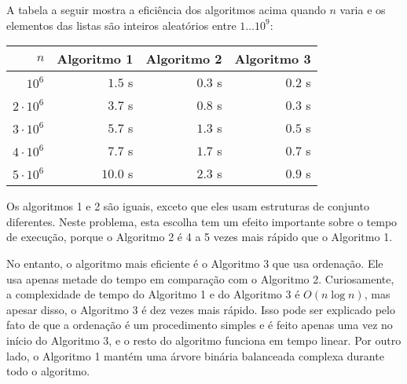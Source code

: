 A tabela a seguir mostra a eficiência
dos algoritmos acima quando $n$ varia e
os elementos das listas são inteiros aleatórios
entre $1 \ldots 10^9$:

\begin{center}
\begin{tabular}{rrrr}
$n$ & Algoritmo 1 & Algoritmo 2 & Algoritmo 3 \\
\hline
$10^6$ & $1.5$ s & $0.3$ s & $0.2$ s \\
$2 \cdot 10^6$ & $3.7$ s & $0.8$ s & $0.3$ s \\
$3 \cdot 10^6$ & $5.7$ s & $1.3$ s & $0.5$ s \\
$4 \cdot 10^6$ & $7.7$ s & $1.7$ s & $0.7$ s \\
$5 \cdot 10^6$ & $10.0$ s & $2.3$ s & $0.9$ s \\
\end{tabular}
\end{center}

Os algoritmos 1 e 2 são iguais, exceto que
eles usam estruturas de conjunto diferentes.
Neste problema, esta escolha tem um efeito importante sobre
o tempo de execução, porque o Algoritmo 2
é 4 a 5 vezes mais rápido que o Algoritmo 1.

No entanto, o algoritmo mais eficiente é o Algoritmo 3
que usa ordenação.
Ele usa apenas metade do tempo em comparação com o Algoritmo 2.
Curiosamente, a complexidade de tempo do Algoritmo 1
e do Algoritmo 3 é $O(n \log n)$,
mas apesar disso, o Algoritmo 3 é dez vezes mais rápido.
Isso pode ser explicado pelo fato de que
a ordenação é um procedimento simples e é feito
apenas uma vez no início do Algoritmo 3,
e o resto do algoritmo funciona em tempo linear.
Por outro lado,
o Algoritmo 1 mantém uma árvore binária balanceada complexa
durante todo o algoritmo.
